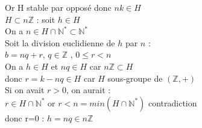 \documentclass{article}
\begin{document}
Or H stable par opposé donc $nk \in H$ \\ 
\underline{$H \subset n \mathbb{Z}$} : soit $h \in H$ \\ 
On a $n \in H \cap \mathbb{N}^\ast \subset \mathbb{N}^\ast$ \\ 
Soit la division euclidienne de $h$ par $n$ : \\ 
$b=nq+r$, $q \in  \mathbb{Z}$ , $0 \leq r <n$ \\ 
On a $h \in H$ et $nq \in H$ car $n \mathbb{Z} \subset H$ \\ 
donc $r=k-nq \in H$ car $H$ sous-groupe de $(\mathbb{Z},+)$ \\ 
Si on avait $r>0$, on aurait : \\ 
$r \in H \cap \mathbb{N}^\ast$ or $r<n=min(H \cap \mathbb{N}^\ast)$ contradiction \\ 
donc r=0 : $h=nq \in n \mathbb{Z}$
\end{document}
